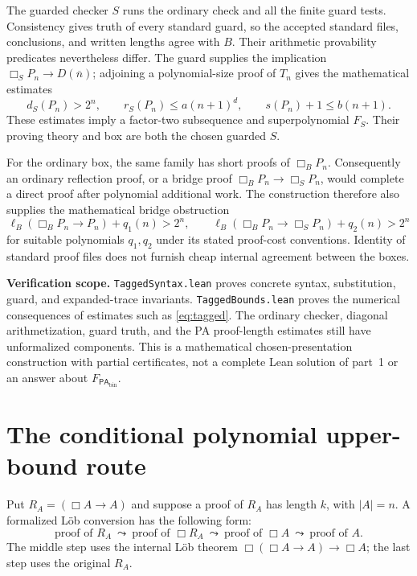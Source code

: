 \documentclass[11pt]{article}
\theoremstyle{definition}
\theoremstyle{remark}
\newcommand{\PAbin}{\mathsf{PA}_{\mathrm{bin}}}
\newcommand{\num}[1]{\overline{#1}}
\newcommand{\status}[1]{\par\smallskip\noindent\textbf{Verification scope.} #1\par\smallskip}
\begin{document}
The guarded checker $S$ runs the ordinary check and all the finite guard tests.
Consistency gives truth of every standard guard, so the accepted standard
files, conclusions, and written lengths agree with $B$. Their arithmetic
provability predicates nevertheless differ. The guard supplies the implication
$\Box_SP_n\to D(\num n)$; adjoining a polynomial-size proof of $T_n$
gives the mathematical estimates
\begin{equation}\label{eq:tagged}
 d_S(P_n)>2^n,\qquad r_S(P_n)\le a(n+1)^d,\qquad
 s(P_n)+1\le b(n+1).
\end{equation}
These estimates imply a factor-two subsequence and superpolynomial $F_S$.
Their proving theory and box are both the chosen guarded $S$.

For the ordinary box, the same family has short proofs of $\Box_BP_n$.
Consequently an ordinary reflection proof, or a bridge proof
$\Box_BP_n\to\Box_SP_n$, would complete a direct proof after polynomial
additional work. The construction therefore also supplies the mathematical
bridge obstruction
\[
 \ell_B(\Box_BP_n\to P_n)+q_1(n)>2^n,\qquad
 \ell_B(\Box_BP_n\to\Box_SP_n)+q_2(n)>2^n
\]
for suitable polynomials $q_1,q_2$ under its stated proof-cost conventions.
Identity of standard proof files does not furnish cheap internal agreement
between the boxes.

\status{\texttt{TaggedSyntax.lean} proves concrete syntax, substitution,
guard, and expanded-trace invariants. \texttt{TaggedBounds.lean} proves the
numerical consequences of estimates such as \eqref{eq:tagged}. The ordinary
checker, diagonal arithmetization, guard truth, and the PA proof-length
estimates still have unformalized components. This is a mathematical
chosen-presentation construction with partial certificates, not a complete
Lean solution of part~1 or an answer about $F_{\PAbin}$.}

\section{The conditional polynomial upper-bound route}
\label{sec:upper}

Put $R_A=(\Box A\to A)$ and suppose a proof of $R_A$ has length $k$, with
$|A|=n$. A formalized L\"ob conversion has the following form:
\[
 \text{proof of }R_A
 \ \leadsto\ \text{proof of }\Box R_A
 \ \leadsto\ \text{proof of }\Box A
 \ \leadsto\ \text{proof of }A.
\]
The middle step uses the internal L\"ob theorem
$\Box(\Box A\to A)\to\Box A$; the last step uses the original $R_A$.
\end{document}
